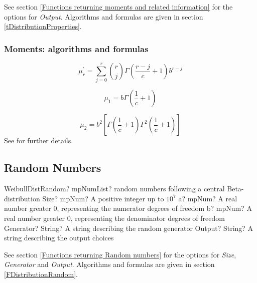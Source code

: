 \vspace{0.3cm}

See section \ref{Functions returning moments and related information} for the options for {\itshape\sffamily Output}. Algorithms and formulas are given in section \ref{tDistributionProperties}.



\subsubsection{Moments: algorithms and formulas}

\begin{equation} 
	\mu_r^{'} = \sum_{j=0}^r \binom{r}{j} \Gamma\left(\frac{r-j}{c}+1 \right) b^{r-j}
\end{equation}

\begin{equation} 
	\mu_1 = b \Gamma\left(\frac{1}{c}+1 \right) 
\end{equation}

\begin{equation} 
	\mu_2 = b^2 \left[ \Gamma\left(\frac{1}{c}+1\right) \Gamma^2\left(\frac{1}{c}+1\right)  \right]
\end{equation}
See \cite{Rinne_book_2008} for further details.

\subsection{Random Numbers}

\begin{mpFunctionsExtract}
	\mpFunctionFiveNotImplemented
	{WeibullDistRandom? mpNumList? random numbers following a central Beta-distribution}
	{Size? mpNum? A positive integer up to $10^7$}
	{a? mpNum? A real number greater 0, representing the numerator  degrees of freedom}
	{b? mpNum? A real number greater 0, representing the denominator degrees of freedom}
	{Generator? String? A string describing the random generator}
	{Output? String? A string describing the output choices}
\end{mpFunctionsExtract}

\vspace{0.3cm}

See section \ref{Functions returning Random numbers} for the options for  {\itshape\sffamily Size},  {\itshape\sffamily Generator} and {\itshape\sffamily Output}. Algorithms and formulas are given in section \ref{FDistributionRandom}.




